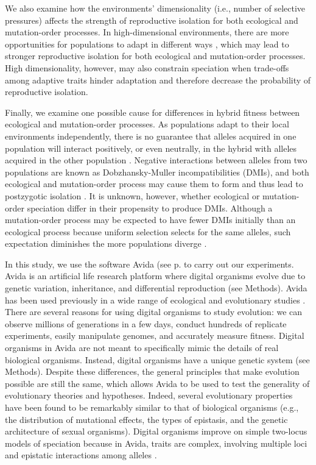 \begin{doublespace}
We also examine how the environments' dimensionality
(i.e., number of selective pressures)
affects the strength of reproductive isolation
for both ecological and mutation-order processes.
%
In high-dimensional environments,
there are more opportunities for populations
to adapt in different ways \citep{ric93,nos09},
which may lead to stronger reproductive isolation
for both ecological and mutation-order processes.
%
High dimensionality, however, may also constrain speciation
when trade-offs among adaptive traits hinder adaptation
and therefore decrease the probability of reproductive isolation.



Finally, we examine one possible cause for differences
in hybrid fitness between ecological and mutation-order processes.
%
As populations adapt to their local environments independently,
there is no guarantee that alleles acquired in one population
will interact positively, or even neutrally, in the hybrid
with alleles acquired in the other population \citep{coy04}.
%
Negative interactions between alleles from two populations
are known as Dob\-zhan\-sky-Mul\-ler incompatibilities (DMIs),
and both ecological and mutation-order process
may cause them to form and thus lead to postzygotic isolation \citep{sch09}.
%
It is unknown, however, whether ecological or mutation-order speciation
differ in their propensity to produce DMIs.
%
Although a mutation-order process may be expected to have
fewer DMIs initially than an ecological process
because uniform selection selects for the same alleles,
such expectation diminishes the more populations diverge \citep{sch09}.



In this study, we use the software Avida (see p. \pageref{sec:avida}
to carry out our experiments.
%
Avida \citep{ofr04} is an artificial life research platform
where digital organisms evolve due to genetic variation, inheritance,
and differential reproduction (see Methods).
%
Avida has been used previously
in a wide range of ecological and evolutionary studies
\citep[e.g.,][]{len03,cho04,ele07,ost07,mis10}.
%
There are several reasons for using digital organisms to study evolution:
we can observe millions of generations in a few days,
conduct hundreds of replicate experiments,
easily manipulate genomes,
and accurately measure fitness.
%
Digital organisms in Avida are not meant to specifically mimic
the details of real biological organisms.
%
Instead, digital organisms have a unique genetic system (see Methods).
%
Despite these differences, the general principles
that make evolution possible are still the same,
which allows Avida to be used to test the generality
of evolutionary theories and hypotheses.
%
Indeed, several evolutionary properties
have been found to be remarkably similar to that of biological organisms
\citep{wil02,ada06}
(e.g., the distribution of mutational effects, the types of epistasis,
and the genetic architecture of sexual organisms).
%
Digital organisms improve on simple two-locus models of speciation
because in Avida, traits are complex,
involving multiple loci and epistatic interactions among alleles \citep{len99}.




\end{doublespace}
